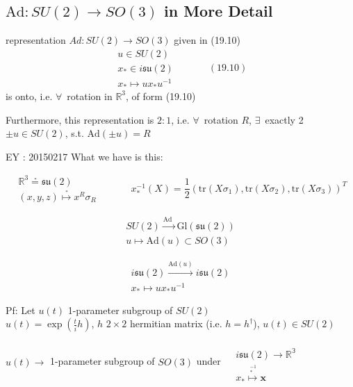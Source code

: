 \subsection{$\text{Ad}:SU(2) \to SO(3)$ in More Detail}

\begin{theorem}[19.12]
representation $Ad:SU(2) \to SO(3)$ given in (19.10)
\begin{equation}
\begin{aligned}
  u \in SU(2) \\ 
  x_* \in i\mathfrak{su}(2) \\ 
  x_* \mapsto ux_* u^{-1} 
\end{aligned} \quad \quad \quad \, (19.10)
\end{equation}
is onto, i.e. $\forall \, $ rotation in $\mathbb{R}^3$, of form (19.10)


Furthermore, this representation is $2:1$, i.e. $\forall \, $ rotation $R$, $\exists \, $ exactly 2 $\pm u \in SU(2)$, s.t. $\text{Ad}(\pm u) = R$
\end{theorem}

EY : 20150217 What we have is this:

\[
\begin{aligned}
  \mathbb{R}^3 \overset{ \,_* }{=} \mathfrak{su}(2) \\ 
  (x,y,z) \overset{ \,_* }{ \mapsto } x^R \sigma_R
\end{aligned} \quad \quad \quad \, x_*^{-1}(X) = \frac{1}{2} ( \text{tr}(X\sigma_1 ), \text{tr}(X\sigma_2 ), \text{tr}(X\sigma_3 ) )^T
\]

\[
\begin{aligned}
  SU(2) \xrightarrow{ \text{Ad } } \text{Gl}(\mathfrak{su}(2)) \\ 
  u \mapsto \text{Ad}(u) \subset SO(3)
\end{aligned}
\]

\[
\begin{aligned}
  i\mathfrak{su}(2) \xrightarrow{ \text{Ad}(u) } i \mathfrak{su}(2) \\ 
  x_* \mapsto ux_* u^{-1}
\end{aligned}
\]


Pf: Let $u(t)$ 1-parameter subgroup of $SU(2)$ \\
\phantom{Pf: Let } $u(t) = \exp{ \left( \frac{t}{i} h \right)}$, $h$ $2\times 2$ hermitian matrix (i.e. $h=h^{\dag}$), $u(t) \in SU(2)$

$u(t) \to$ 1-parameter subgroup of $SO(3)$ under $ \begin{aligned}
  & \quad \\ 
  & i\mathfrak{su}(2) \to \mathbb{R^3} \\
  & x_* \overset{ \,_*^{-1}}{\mapsto} \mathbf{x} \end{aligned}$

